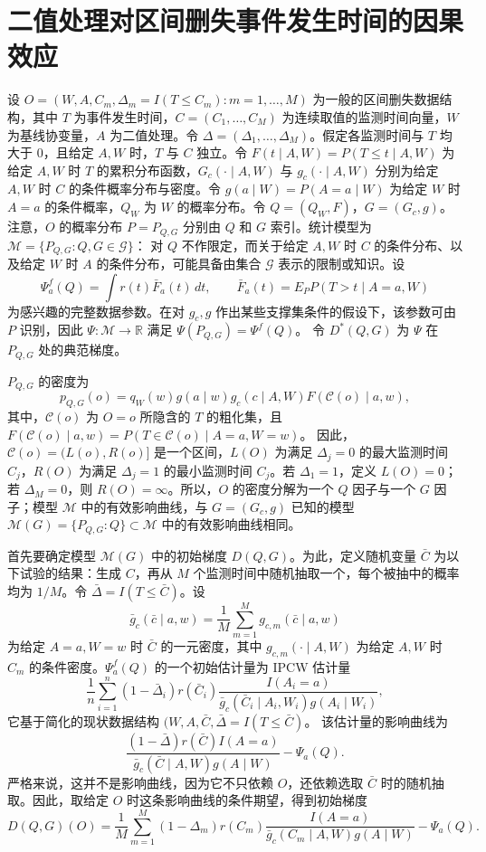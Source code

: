 \section{二值处理对区间删失事件发生时间的因果效应}

设 $O=(W,A,C_m,\Delta_m=I(T\leq C_m):m=1,\ldots,M)$ 为一般的区间删失数据结构，其中 $T$ 为事件发生时间，$C=(C_1,\ldots,C_M)$ 为连续取值的监测时间向量，$W$ 为基线协变量，$A$ 为二值处理。令 $\Delta=(\Delta_1,\ldots,\Delta_M)$。假定各监测时间与 $T$ 均大于 0，且给定 $A,W$ 时，$T$ 与 $C$ 独立。令
$F(t\mid A,W)=P(T\leq t\mid A,W)$
为给定 $A,W$ 时 $T$ 的累积分布函数，$G_c(\cdot\mid A,W)$ 与 $g_c(\cdot\mid A,W)$ 分别为给定 $A,W$ 时 $C$ 的条件概率分布与密度。令
$g(a\mid W)=P(A=a\mid W)$
为给定 $W$ 时 $A=a$ 的条件概率，$Q_W$ 为 $W$ 的概率分布。令 $Q=(Q_W,F)$，$G=(G_c,g)$。注意，$O$ 的概率分布 $P=P_{Q,G}$ 分别由 $Q$ 和 $G$ 索引。统计模型为
$\mathcal M=\{P_{Q,G}:Q,G\in\mathcal G\}$：
对 $Q$ 不作限定，而关于给定 $A,W$ 时 $C$ 的条件分布、以及给定 $W$ 时 $A$ 的条件分布，可能具备由集合 $\mathcal G$ 表示的限制或知识。设
\[
 \Psi_a^f(Q)=\int r(t)\bar F_a(t)\,dt,\qquad
 \bar F_a(t)=E_PP(T>t\mid A=a,W)
\]
为感兴趣的完整数据参数。在对 $g_c,g$ 作出某些支撑集条件的假设下，该参数可由 $P$ 识别，因此 $\Psi:\mathcal M\to\mathbb R$ 满足
$\Psi(P_{Q,G})=\Psi^f(Q)$。
令 $D^*(Q,G)$ 为 $\Psi$ 在 $P_{Q,G}$ 处的典范梯度。

$P_{Q,G}$ 的密度为
\[
 p_{Q,G}(o)=q_W(w)g(a\mid w)g_c(c\mid A,W)F(\mathcal C(o)\mid a,w),
\]
其中，$\mathcal C(o)$ 为 $O=o$ 所隐含的 $T$ 的粗化集，且
$F(\mathcal C(o)\mid a,w)=P(T\in\mathcal C(o)\mid A=a,W=w)$。
因此，$\mathcal C(o)=(L(o),R(o)]$ 是一个区间，$L(O)$ 为满足 $\Delta_j=0$ 的最大监测时间 $C_j$，$R(O)$ 为满足 $\Delta_j=1$ 的最小监测时间 $C_j$。若 $\Delta_1=1$，定义 $L(O)=0$；若 $\Delta_M=0$，则 $R(O)=\infty$。所以，$O$ 的密度分解为一个 $Q$ 因子与一个 $G$ 因子；模型 $\mathcal M$ 中的有效影响曲线，与 $G=(G_c,g)$ 已知的模型 $\mathcal M(G)=\{P_{Q,G}:Q\}\subset\mathcal M$ 中的有效影响曲线相同。

首先要确定模型 $\mathcal M(G)$ 中的初始梯度 $D(Q,G)$。为此，定义随机变量 $\bar C$ 为以下试验的结果：生成 $C$，再从 $M$ 个监测时间中随机抽取一个，每个被抽中的概率均为 $1/M$。令 $\bar\Delta=I(T\leq\bar C)$。设
\[
 \bar g_c(\bar c\mid a,w)=\frac1M\sum_{m=1}^M g_{c,m}(\bar c\mid a,w)
\]
为给定 $A=a,W=w$ 时 $\bar C$ 的一元密度，其中 $g_{c,m}(\cdot\mid A,W)$ 为给定 $A,W$ 时 $C_m$ 的条件密度。$\Psi_a^f(Q)$ 的一个初始估计量为 IPCW 估计量
\[
 \frac1n\sum_{i=1}^n(1-\bar\Delta_i)r(\bar C_i)
 \frac{I(A_i=a)}{\bar g_c(\bar C_i\mid A_i,W_i)g(A_i\mid W_i)},
\]
它基于简化的现状数据结构
$(W,A,\bar C,\bar\Delta=I(T\leq\bar C)$。
该估计量的影响曲线为
\[
 \frac{(1-\bar\Delta)r(\bar C)I(A=a)}
 {\bar g_c(\bar C\mid A,W)g(A\mid W)}-\Psi_a(Q).
\]
严格来说，这并不是影响曲线，因为它不只依赖 $O$，还依赖选取 $\bar C$ 时的随机抽取。因此，取给定 $O$ 时这条影响曲线的条件期望，得到初始梯度
\[
 D(Q,G)(O)=\frac1M\sum_{m=1}^M(1-\Delta_m)r(C_m)
 \frac{I(A=a)}{\bar g_c(C_m\mid A,W)g(A\mid W)}-\Psi_a(Q).
\]

